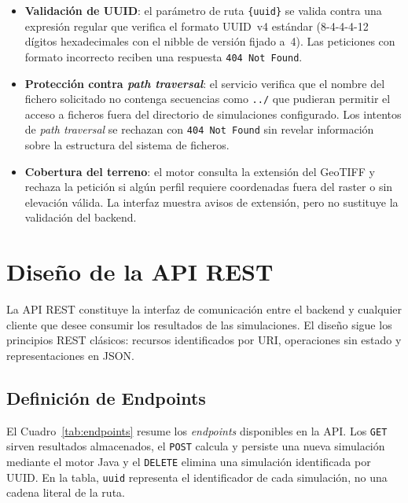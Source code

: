 \begin{itemize}
  \item \textbf{Validación de UUID}: el parámetro de ruta \texttt{\{uuid\}} se valida
    contra una expresión regular que verifica el formato UUID~v4 estándar
    (8-4-4-4-12 dígitos hexadecimales con el nibble de versión fijado a~4).
    Las peticiones con formato incorrecto reciben una respuesta \texttt{404 Not Found}.
  \item \textbf{Protección contra \textit{path traversal}}: el servicio verifica que el
    nombre del fichero solicitado no contenga secuencias como \texttt{../} que pudieran
    permitir el acceso a ficheros fuera del directorio de simulaciones configurado. Los
    intentos de \textit{path traversal} se rechazan con \texttt{404 Not Found} sin
    revelar información sobre la estructura del sistema de ficheros.
  \item \textbf{Cobertura del terreno}: el motor consulta la extensión del GeoTIFF y
    rechaza la petición si algún perfil requiere coordenadas fuera del raster o sin
    elevación válida. La interfaz muestra avisos de extensión, pero no sustituye la
    validación del backend.
\end{itemize}

\section{Diseño de la API REST}
\label{sec:api}

La API REST constituye la interfaz de comunicación entre el backend y cualquier cliente que
desee consumir los resultados de las simulaciones. El diseño sigue los principios REST
clásicos: recursos identificados por URI, operaciones sin estado y representaciones en
JSON.

\subsection{Definición de Endpoints}
\label{subsec:endpoints}

El Cuadro~\ref{tab:endpoints} resume los \textit{endpoints} disponibles en la API. Los
\lstinline{GET} sirven resultados almacenados, el \lstinline{POST} calcula y persiste una
nueva simulación mediante el motor Java y el \lstinline{DELETE} elimina una simulación
identificada por UUID. En la tabla, \texttt{uuid} representa el identificador de cada
simulación, no una cadena literal de la ruta.

